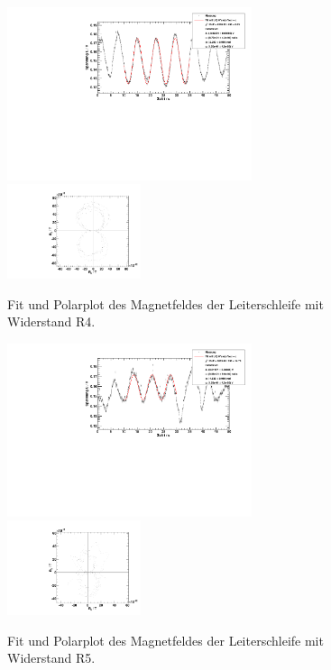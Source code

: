 \begin{figure}[H]
\begin{center}
  \includegraphics[width=0.64\textwidth]{../img/fit_Spule_R4.pdf}
  \includegraphics[width=0.35\textwidth]{../img/polar_Spule_R4.pdf}
  \caption{Fit und Polarplot des Magnetfeldes der Leiterschleife mit Widerstand R4.}
  \label{img:R4}
\end{center}
\end{figure}

\begin{figure}[H]
\begin{center}
  \includegraphics[width=0.64\textwidth]{../img/fit_Spule_R5_1.pdf}
  \includegraphics[width=0.35\textwidth]{../img/polar_Spule_R5_1.pdf}
  \caption{Fit und Polarplot des Magnetfeldes der Leiterschleife mit Widerstand R5.}
  \label{img:R5}
\end{center}
\end{figure}

